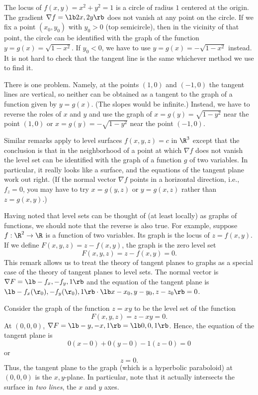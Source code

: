 \nextex
{}
The locus of $f(x,y) = x^2 + y^2 = 1$ is a circle of radius $1$
centered at the origin.  The gradient $\nabla f = \lb 2x, 2y \rb$
does not vanish at any point on the circle. If we fix a point $(x_0,y_0)$
with $y_0 > 0$ (top semicircle),
then in the vicinity of that point, the circle can be identified
with the graph of the function $y = g(x) = \sqrt{1 - x^2}$.
If $y_0 < 0$, we have to use $y = g(x) = -\sqrt{1 - x^2}$ instead.
It is not hard to check that the tangent line is the same whichever
method we use to find it.  

There is one problem.  Namely, at the points $(1,0)$ and $(-1,0)$
the tangent lines are vertical, so neither can be obtained as
a tangent to the graph of a function given by $y = g(x)$.  (The
slopes would be infinite.)   Instead, we have to reverse the
roles of $x$ and $y$ and use the graph of $x = g(y) = \sqrt{1 - y^2}$
near the point $(1,0)$ or $x = g(y) = -\sqrt{1 - y^2}$ near the
point $(-1,0)$.   
\endexample

Similar remarks apply to level surfaces $f(x,y,z) = c$ in
$\R^3$ except that the conclusion is that in the neighborhood
of a point at which $\nabla f$ does not vanish the level set
can be identified with the graph of a function $g$ of two
variables.  In particular, it really looks like a surface, and
the equations of the tangent plane work out right.  (If the
normal vector $\nabla f$  points in a horizontal direction,
i.e., $f_z = 0$, you may have to try  $x = g(y,z)$ or $y = g(x,z)$
rather than $z = g(x,y)$.)

 
Having noted that level sets can be thought of (at least locally)
as graphs of functions, we should note that the reverse is
also true.  For example, suppose $f:\R^2 \to \R$ is a function
of two variables.  Its graph is the locus of $z = f(x,y)$. If
we define $F(x,y,z) = z- f(x,y)$, the graph is the zero level
set
$$
   F(x,y,z) = z - f(x,y)= 0.
$$
This remark allows us to treat the theory of tangent planes to
graphs as a special case
of the theory of tangent planes to level sets. 
The normal
vector is $\nabla F = \lb -f_x, -f_y, 1 \rb$ and the equation
of the tangent plane is $\lb -f_x(\r_0), -f_y(\r_0), 1 \rb
\cdot \lb x - x_0, y - y_0, z - z_0 \rb = 0$.

\nextex
{}
Consider the graph of the function $z = xy$ to be the
level set of the function
$$  F(x,y,z) = z - xy = 0.
$$
At $(0,0,0)$,
$\nabla F = \lb -y, -x, 1 \rb = \lb 0, 0, 1 \rb$.  Hence, the
equation of the tangent plane
is
$$
    0(x - 0) + 0(y - 0) -1(z - 0)  = 0
$$
or
$$ z = 0.$$
Thus, the tangent plane to the graph (which is a hyperbolic paraboloid)
at $(0,0,0)$ is the $x,y$-plane.  In particular, note that it
actually intersects the surface in {\it two lines}, the
$x$ and $y$ axes.  
\endexample 

